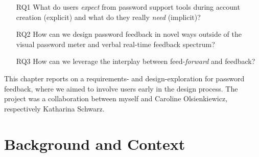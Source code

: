 \begin{itemize}
	\item[RQ1] What do users \textit{expect} from password support tools during account creation (explicit) and what do they really \textit{need} (implicit)?
	\item[RQ2] How can we design password feedback in novel ways outside of the visual password meter and verbal real-time feedback spectrum? %
	\item[RQ3] How can we leverage the interplay between feed-\textit{forward} and feedback?
\end{itemize}



%
%
%
%



This chapter reports on a requirements- and design-exploration for password feedback, where we aimed to involve users early in the design process. The project was a collaboration between myself and Caroline Olsienkiewicz, respectively Katharina Schwarz. 

\section{Background and Context}

